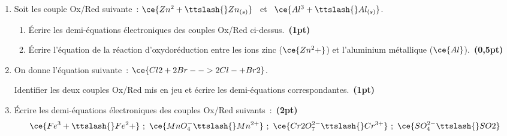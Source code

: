 \begin{enumerate}
    \item Soit les couple Ox/Red suivante~: $\ce{Zn^2+\ttslash{}Zn_{(s)}}$ \
          et \ $\ce{Al^3+\ttslash{}Al_{(s)}}$.
          \begin{enumerate}
              \item Écrire les demi-équations électroniques des couples Ox/Red
                    ci-dessus.~\textbf{(1pt)}
              \item Écrire l'équation de la réaction d'oxydoréduction entre les
                    ions zinc ($\ce{Zn^2+}$) et l'aluminium métallique
                    ($\ce{Al}$).~\textbf{(0,5pt)}
          \end{enumerate}
    \item On donne l'équation suivante~: $\ce{Cl2 + 2Br- -> 2Cl- + Br2}$.
          
          Identifier les deux couples Ox/Red mis en jeu et écrire les
          demi-équations correspondantes.~\textbf{(1pt)}
    \item Écrire les demi-équations électroniques des couples Ox/Red
          suivants~:~\textbf{(2pt)}
          \[
              \ce{Fe^3+\ttslash{}Fe^2+}~; \
              \ce{MnO_4^-\ttslash{}Mn^{2+}}~; \
              \ce{Cr2O_7^{2-}\ttslash{}Cr^{3+}}~; \
              \ce{SO_4^{2-}\ttslash{}SO2}
          \]
\end{enumerate}

